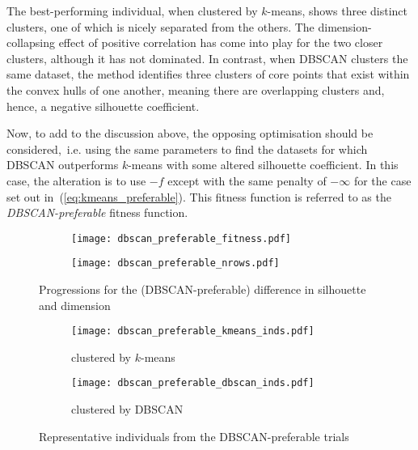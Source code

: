 The best-performing individual, when clustered by \(k\)-means, shows three
distinct clusters, one of which is nicely separated from the others. The
dimension-collapsing effect of positive correlation has come into play for the
two closer clusters, although it has not dominated. In contrast, when DBSCAN
clusters the same dataset, the method identifies three clusters of core points
that exist within the convex hulls of one another, meaning there are overlapping
clusters and, hence, a negative silhouette coefficient.


Now, to add to the discussion above, the opposing optimisation should be
considered,~i.e. using the same parameters to find the datasets for which DBSCAN
outperforms \(k\)-means with some altered silhouette coefficient. In this case,
the alteration is to use \(-f\) except with the same penalty of \(-\infty\) for
the case set out in~(\ref{eq:kmeans_preferable}). This fitness function is
referred to as the \emph{DBSCAN-preferable} fitness function.

\begin{figure}[htbp]
    \centering
    \begin{subfigure}{\imgwidth}
        \texttt{[image: dbscan\_preferable\_fitness.pdf]}
    \end{subfigure}

    \begin{subfigure}{\imgwidth}
        \texttt{[image: dbscan\_preferable\_nrows.pdf]}
    \end{subfigure}
    \caption{%
        Progressions for the (DBSCAN-preferable) difference in silhouette and
        dimension
    }\label{fig:dbscan_preferable_progression}
\end{figure}

\begin{figure}
    \centering
    \begin{subfigure}{\imgwidth}
        \centering
        \texttt{[image: dbscan\_preferable\_kmeans\_inds.pdf]}
        \caption{%
            clustered by \(k\)-means
        }\label{fig:dbscan_preferable_kmeans_inds}
    \end{subfigure}

    \vspace{1em}
    \begin{subfigure}{\imgwidth}
        \centering
        \texttt{[image: dbscan\_preferable\_dbscan\_inds.pdf]}
        \caption{clustered by DBSCAN}\label{fig:dbscan_preferable_dbscan_inds}
    \end{subfigure}
    \caption{%
        Representative individuals from the DBSCAN-preferable trials
    }\label{fig:dbscan_preferable_inds}
\end{figure}

